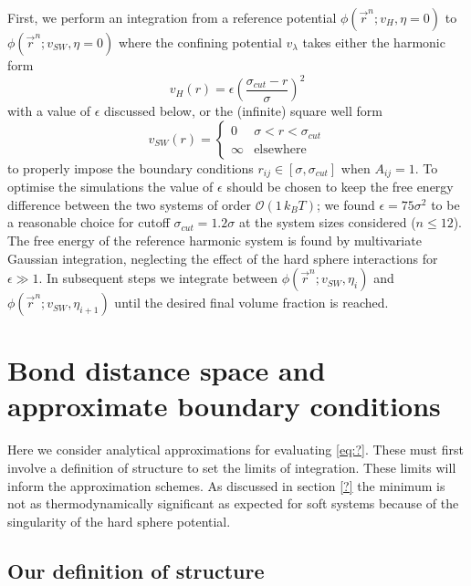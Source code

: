 \documentclass[11pt,twoside]{report}
\begin{document}
First, we perform an integration from a reference potential $\phi(\vec{r}^n; v_H, \eta=0)$ to $\phi(\vec{r}^n; v_{SW}, \eta=0)$ where the confining potential $v_\lambda$ takes either the harmonic form
\begin{equation}
  v_H(r) = \epsilon \left(\frac{\sigma_{cut} - r}{\sigma}\right)^2
\end{equation}
with a value of $\epsilon$ discussed below, or the (infinite) square well form
\begin{equation}
  v_{SW}(r) =
  \begin{cases}
    0 &\sigma < r < \sigma_{cut} \\
    \infty &\textrm{elsewhere}
  \end{cases}
\end{equation}
to properly impose the boundary conditions $r_{ij} \in [\sigma, \sigma_{cut}]$ when $A_{ij} = 1$.
To optimise the simulations the value of $\epsilon$ should be chosen to keep the free energy difference between the two systems of order $\mathcal{O}(1 \, k_B T)$; we found $\epsilon = 75\sigma^2$ to be a reasonable choice for cutoff $\sigma_{cut} = 1.2\sigma$ at the system sizes considered ($n \le 12$).
The free energy of the reference harmonic system is found by multivariate Gaussian integration, neglecting the effect of the hard sphere interactions for $\epsilon \gg 1$.
In subsequent steps we integrate between $\phi(\vec{r}^n; v_{SW}, \eta_i)$ and $\phi(\vec{r}^n; v_{SW}, \eta_{i+1})$ until the desired final volume fraction is reached.

\section{Bond distance space and approximate boundary conditions}

Here we consider analytical approximations for evaluating \eqref{eq:?}.
These must first involve a definition of structure to set the limits of integration.
These limits will inform the approximation schemes.
As discussed in section \ref{?} the minimum is not as thermodynamically significant as expected for soft systems because of the singularity of the hard sphere potential.

\subsection{Our definition of structure}
\end{document}
